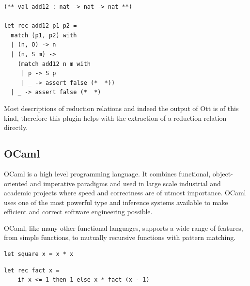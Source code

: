 \documentclass[12pt,twoside,notitlepage]{report}
\begin{document}
\begin{minipage}{\linewidth}

\begin{lstlisting}[language={Coq},caption={Coq to OCaml extraction of a logical inductive relation}, label={lst:coqlogindextractex}]
(** val add12 : nat -> nat -> nat **)

let rec add12 p1 p2 =
  match (p1, p2) with
  | (n, O) -> n
  | (n, S m) ->
    (match add12 n m with
     | p -> S p
     | _ -> assert false (*  *))
  | _ -> assert false (*  *)
\end{lstlisting}

\end{minipage}

Most descriptions of reduction relations and indeed the output of Ott is of this kind, therefore this plugin helps with the extraction of a reduction relation directly. 

\subsection{OCaml}
OCaml is a high level programming language. It combines functional, object-oriented and imperative paradigms and used in large scale industrial and academic projects where speed and correctness are of utmost importance. OCaml uses one of the most powerful type and inference systems available to make efficient and correct software engineering possible.

OCaml, like many other functional languages, supports a wide range of features, from simple functions, to mutually recursive functions with pattern matching.
\vspace{3mm}

\begin{minipage}{\linewidth}
\begin{lstlisting}[caption={OCaml simple function example: square}]
let square x = x * x
\end{lstlisting}

\end{minipage}



\begin{minipage}{\linewidth}

\begin{lstlisting}[caption={OCaml recursive function example: factorial}]
let rec fact x =
    if x <= 1 then 1 else x * fact (x - 1)
\end{lstlisting}

\end{minipage}
\end{document}
